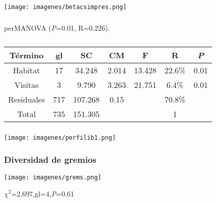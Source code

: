 \documentclass[compress]{beamer}
\begin{document}
{
\begin{frame}
\frametitle{}
\begin{center}
\texttt{[image: imagenes/betacsimpres.png]}\\
\end{center}

\end{frame}
}

{
\begin{frame}
\frametitle{}
\begin{itemize}
\normalsize{\item perMANOVA  (\textit{P}=0.01, R=0.226).}
\end{itemize}
\begin{center}
{\small
\begin{longtable}[c] {ccccccc} 
\caption[]{} \\
Término & gl & SC & CM & F & R & \textit{P}   \\ \midrule
Habitat & 17 & 34.248 & 2.014 & 13.428 & {\color{red} 22.6\%} & 0.01 \\
Visitas & 3 & 9.790 & 3.263 & 21.751 & {\color{red} 6.4\%} & 0.01 \\
Residuales & 717 & 107.268 & 0.15 &  &{\color{red} 70.8\%} &  \\ 
Total & 735 & 151.305 & & & 1 & \\ \bottomrule

\end{longtable}
}
\end{center}

\end{frame}
}

{
\begin{frame}
\frametitle{}
\begin{center}
\texttt{[image: imagenes/perfilib1.png]}\\
\end{center}
\end{frame}
}
{
\begin{frame}
\frametitle{Diversidad de gremios}

\begin{center}
\hspace*{-0.5cm}\texttt{[image: imagenes/grems.png]}\\
\end{center}

\begin{center}
\begin{itemize}
\centering
\normalsize{\item $\chi^{2}$=2.697,gl=4,\textit{P}=0.61}
\end{itemize}
\end{center}
\end{frame}
}
\end{document}

